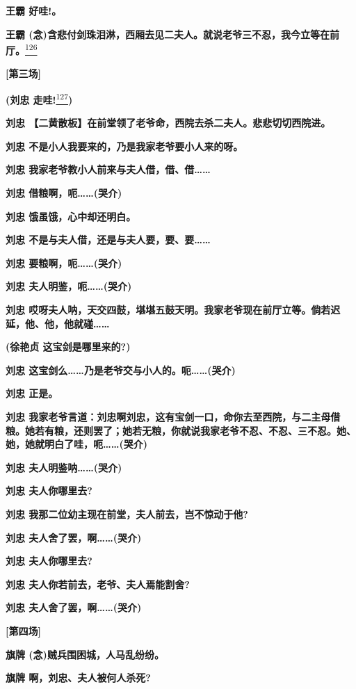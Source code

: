 \textbf{王霸 好哇!。}

\textbf{王霸
(念)含悲付剑珠泪淋，西厢去见二夫人。就说老爷三不忍，我今立等在前厅。}\protect\hyperlink{fn126}{\textsuperscript{126}}

\textbf{{[}第三场{]}}

\textbf{(刘忠
走哇!}\protect\hyperlink{fn127}{\textsuperscript{127}}\textbf{)}

\textbf{刘忠
【二黄散板】在前堂领了老爷命，西院去杀二夫人。悲悲切切西院进。}

\textbf{刘忠 不是小人我要来的，乃是我家老爷要小人来的呀。}

\textbf{刘忠 我家老爷教小人前来与夫人借，借、借\ldots{}\ldots{}}

\textbf{刘忠 借粮啊，呃\ldots{}\ldots{}(哭介)}

\textbf{刘忠 饿虽饿，心中却还明白。}

\textbf{刘忠 不是与夫人借，还是与夫人要，要、要\ldots{}\ldots{}}

\textbf{刘忠 要粮啊，呃\ldots{}\ldots{}(哭介)}

\textbf{刘忠 夫人明鉴，呃\ldots{}\ldots{}(哭介)}

\textbf{刘忠
哎呀夫人呐，天交四鼓，堪堪五鼓天明。我家老爷现在前厅立等。倘若迟延，他、他，他就碰\ldots{}\ldots{}}

\textbf{(徐艳贞 这宝剑是哪里来的?)}

\textbf{刘忠
这宝剑么\ldots{}\ldots{}乃是老爷交与小人的。呃\ldots{}\ldots{}(哭介)}

\textbf{刘忠 正是。}

\textbf{刘忠
我家老爷言道：刘忠啊刘忠，这有宝剑一口，命你去至西院，与二主母借粮。她若有粮，还则罢了；她若无粮，你就说我家老爷不忍、不忍、三不忍。她、她，她就明白了哇，呃\ldots{}\ldots{}(哭介)}

\textbf{刘忠 夫人明鉴呐\ldots{}\ldots{}(哭介)}

\textbf{刘忠 夫人你哪里去?}

\textbf{刘忠 我那二位幼主现在前堂，夫人前去，岂不惊动于他?}

\textbf{刘忠 夫人舍了罢，啊\ldots{}\ldots{}(哭介)}

\textbf{刘忠 夫人你哪里去?}

\textbf{刘忠 夫人你若前去，老爷、夫人焉能割舍?}

\textbf{刘忠 夫人舍了罢，啊\ldots{}\ldots{}(哭介)}

\textbf{{[}第四场{]}}

\textbf{旗牌 (念)贼兵围困城，人马乱纷纷。}

\textbf{旗牌 啊，刘忠、夫人被何人杀死?}

